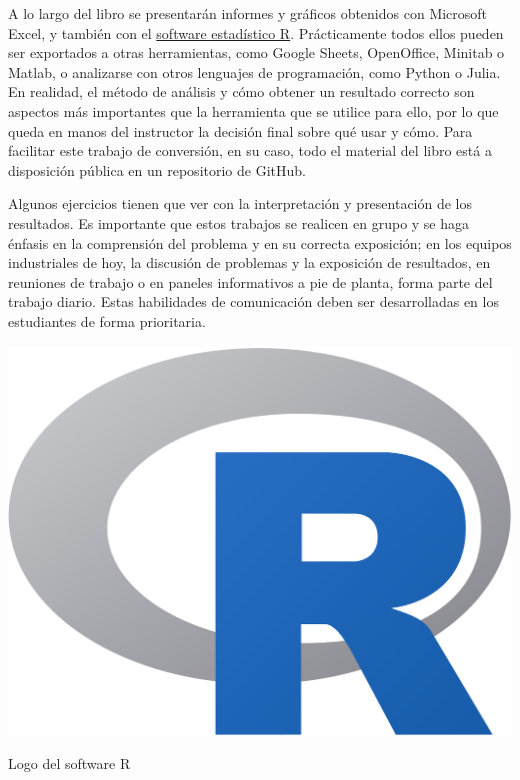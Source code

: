 \documentclass[
  letterpaper,
]{scrbook}
\begin{document}
A lo largo del libro se presentarán informes y gráficos obtenidos con
Microsoft Excel, y también con el
\href{https://en.wikipedia.org/wiki/R_\%28programming_language\%29}{software
estadístico R}. Prácticamente todos ellos pueden ser exportados a otras
herramientas, como Google Sheets, OpenOffice, Minitab o Matlab, o
analizarse con otros lenguajes de programación, como Python o Julia. En
realidad, el método de análisis y cómo obtener un resultado correcto son
aspectos más importantes que la herramienta que se utilice para ello,
por lo que queda en manos del instructor la decisión final sobre qué
usar y cómo. Para facilitar este trabajo de conversión, en su caso, todo
el material del libro está a disposición pública en un repositorio de
GitHub.

Algunos ejercicios tienen que ver con la interpretación y presentación
de los resultados. Es importante que estos trabajos se realicen en grupo
y se haga énfasis en la comprensión del problema y en su correcta
exposición; en los equipos industriales de hoy, la discusión de
problemas y la exposición de resultados, en reuniones de trabajo o en
paneles informativos a pie de planta, forma parte del trabajo diario.
Estas habilidades de comunicación deben ser desarrolladas en los
estudiantes de forma prioritaria.

\begin{marginfigure}

{\centering \includegraphics{./01-imagenes/Rlogo.svg}

}

\caption{Logo del software R}

\end{marginfigure}
\end{document}
